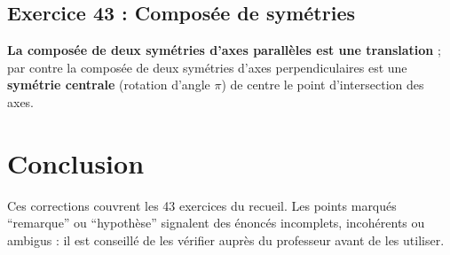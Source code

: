 \documentclass[11pt,a4paper]{article}
\begin{document}
\subsection{Exercice 43 : Compos\'ee de sym\'etries}

\textbf{La compos\'ee de deux sym\'etries d'axes parall\`eles est une \textbf{translation}} ; par contre la compos\'ee de deux
sym\'etries d'axes perpendiculaires est une \textbf{sym\'etrie centrale} (rotation d'angle $\pi$) de centre le point d'intersection des axes.

\section*{Conclusion}
Ces corrections couvrent les 43 exercices du recueil. Les points marqu\'es ``remarque'' ou ``hypoth\`ese'' signalent des
\'enonc\'es incomplets, incoh\'erents ou ambigus : il est conseill\'e de les v\'erifier aupr\`es du professeur avant de les utiliser.
\end{document}
